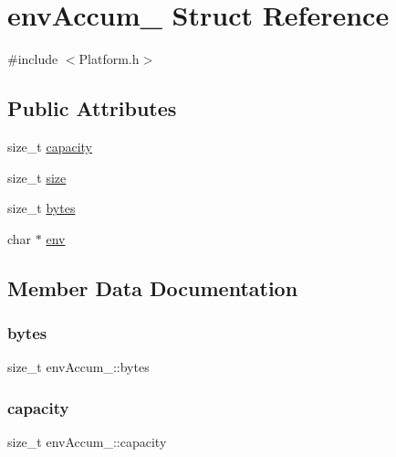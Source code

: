 \hypertarget{structenvAccum__}{}\section{env\+Accum\+\_\+ Struct Reference}
\label{structenvAccum__}


{\ttfamily \#include $<$Platform.\+h$>$}

\subsection*{Public Attributes}
\begin{DoxyCompactItemize}
\item 
size\+\_\+t \hyperlink{structenvAccum___adbb0a3e03a1f64c7c38689c2a8c56d04}{capacity}
\item 
size\+\_\+t \hyperlink{structenvAccum___a65cfbf73ff66184c6d889151e7ba7579}{size}
\item 
size\+\_\+t \hyperlink{structenvAccum___a732faa78e715cb9130731063d5777199}{bytes}
\item 
char $\ast$ \hyperlink{structenvAccum___a552198a002cfdec4c9fcadebf6a4362b}{env}
\end{DoxyCompactItemize}


\subsection{Member Data Documentation}
\mbox{\label{structenvAccum___a732faa78e715cb9130731063d5777199}} 
\subsubsection{\texorpdfstring{bytes}{bytes}}
{\footnotesize\ttfamily size\+\_\+t env\+Accum\+\_\+\+::bytes}

\mbox{\label{structenvAccum___adbb0a3e03a1f64c7c38689c2a8c56d04}} 
\subsubsection{\texorpdfstring{capacity}{capacity}}
{\footnotesize\ttfamily size\+\_\+t env\+Accum\+\_\+\+::capacity}

